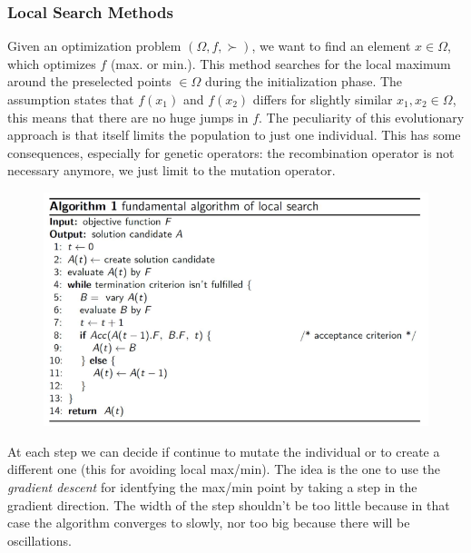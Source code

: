 \documentclass{article}
\begin{document}
\subsubsection{Local Search Methods}
Given an optimization problem $(\Omega, f, \succ)$, we want to find an element $x\in\Omega$, which
optimizes $f$ (max. or min.). This method searches for the local maximum around the preselected
points $\in\Omega$ during the initialization phase.
\newline\newline
The assumption states that $f(x_1)$ and $f(x_2)$ differs for slightly similar $x_1,x_2\in\Omega$, this
means that there are no huge jumps in $f$.
\newline\newline
The peculiarity of this evolutionary approach is that itself limits the population to just one
individual. This has some consequences, especially for genetic operators: the recombination operator
is not necessary anymore, we just limit to the mutation operator.

\begin{figure}[H]
    \centering
    \includegraphics[scale=0.6]{images/local_search_method.png}
\end{figure}
At each step we can decide if continue to mutate the individual or to create a different one (this for
avoiding local max/min). The idea is the one to use the \textit{gradient descent} for identfying
the max/min point by taking a step in the gradient direction. The width of the step shouldn't be
too little because in that case the algorithm converges to slowly, nor too big because there will
be oscillations.
\end{document}

